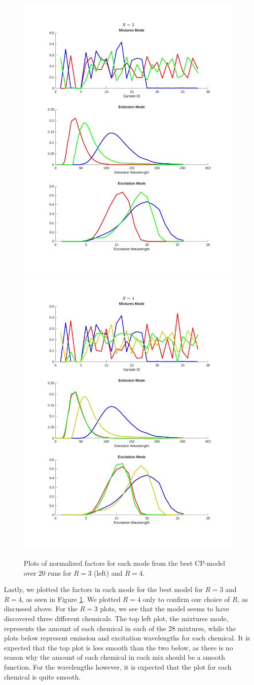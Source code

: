 \begin{figure}[H]
    \centering
    \includegraphics[trim = 2cm 2.5cm 2cm 1.9cm, clip, width=0.46\linewidth]{figures/factors_rank3.pdf}
    \includegraphics[trim = 2cm 2.5cm 2cm 1.9cm, clip, width=0.46\linewidth]{figures/factors_rank4.pdf}
    \caption{Plots of normalized factors for each mode from the best CP-model over 20 runs for $R=3$ (left) and $R=4$.}
    \label{fig:plot_factors}
\end{figure}

Lastly, we plotted the factors in each mode for the best model for $R=3$ and $R=4$, as seen in Figure \ref{fig:plot_factors}.
We plotted $R=4$ only to confirm our choice of $R$, as discussed above.
For the $R=3$ plots, we see that the model seems to have discovered three different chemicals.
The top left plot, the mixtures mode, represents the amount of each chemical in each of the 28 mixtures, while the plots below represent emission and excitation wavelengths for each chemical.
It is expected that the top plot is less smooth than the two below, as there is no reason why the amount of each chemical in each mix should be a smooth function.
For the wavelengths however, it is expected that the plot for each chemical is quite smooth.
